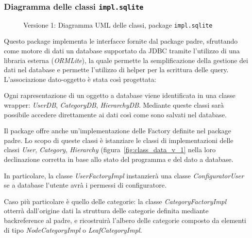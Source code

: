 \subsubsection{Diagramma delle classi \texttt{impl.sqlite}}
\vspace{0.5cm}
\begin{figure}[H]
    \centering
    \caption{Versione 1: Diagramma UML delle classi, package \texttt{impl.sqlite}}
    \label{fig:class_db_v_1}
\end{figure}

Questo package implementa le interfacce fornite dal package padre, sfruttando come motore di dati un database supportato da JDBC
tramite l'utilizzo di una libraria esterna (\textit{ORMLite}), la quale permette la semplificazione della gestione dei dati nel database
e permette l'utilizzo di helper per la scrittura delle query. L'associazione dato-oggetto è stata così progettata:

Ogni rapresentazione di un oggetto a database viene identificata in una classe wrapper: \textit{UserDB}, \textit{CategoryDB}, \textit{HierarchyDB}.
Mediante queste classi sarà possibile accedere direttamente ai dati così come sono salvati nel database.

Il package offre anche un'implementazione delle Factory definite nel package padre. Lo scopo di queste classi
è istanziare le classi di implementazioni delle classi \textit{User}, \textit{Category}, \textit{Hierarchy} (figura~\ref{fig:class_data_v_1}
nella loro declinazione corretta in base allo stato del programma e del dato a database.

In particolare, la classe \textit{UserFactoryImpl} instanzierà una classe \textit{ConfiguratorUser} se a database l'utente avrà
i permessi di configuratore.

Caso più particolare è quello delle categorie:
la classe \textit{CategoryFactoryImpl} otterrà dall'origine dati la struttura delle categorie definita mediante backreference al padre, 
e ricostruirà l'albero delle categorie composto da elementi di tipo \textit{NodeCategoryImpl} o \textit{LeafCategoryImpl}.